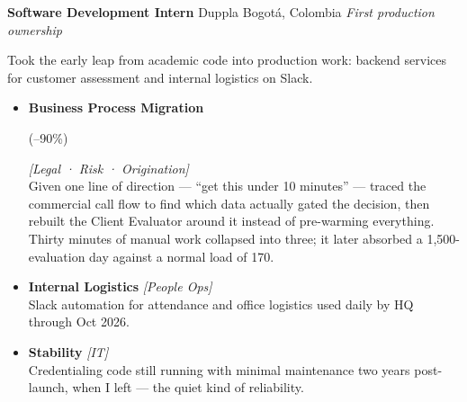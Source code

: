 \documentclass[11pt,a4paper,sans]{moderncv}
\newcommand{\impact}[1]{{\color{slate}\small #1}}
\newcommand{\impactnext}[1]{\\[0.4em]\impact{#1}}
\newcommand{\metric}[1]{%
  \begingroup
  \setlength{\fboxsep}{2pt}%
  \colorbox{whisper}{\color{navy}\bfseries\strut #1}%
  \endgroup
}
\newcommand{\stakeholders}[1]{{\color{azure}\footnotesize\textsf{\textit{[#1]}}}}
\newcommand{\rolebold}[1]{{\color{navy}\bfseries #1}}
\begin{document}
%
  {\textbf{Software Development Intern}}%
  {Duppla}%
  {Bogotá, Colombia}%
  {\textit{First production ownership}}{%
  Took the early leap from academic code into production work: backend services for customer assessment and internal logistics on Slack.
  \begin{itemize}
    \item \rolebold{Business Process Migration} \metric{(--90\%)} \stakeholders{Legal · Risk · Origination}\\
      \impact{Given one line of direction --- ``get this under 10 minutes'' --- traced the commercial call flow to find which data actually gated the decision, then rebuilt the Client Evaluator around it instead of pre-warming everything.}
      \impactnext{Thirty minutes of manual work collapsed into three; it later absorbed a 1,500-evaluation day against a normal load of 170.}
    \item \rolebold{Internal Logistics} \stakeholders{People Ops}\\
      \impact{Slack automation for attendance and office logistics used daily by HQ through Oct 2026.}
    \item \rolebold{Stability} \stakeholders{IT}\\
      \impact{Credentialing code still running with minimal maintenance two years post-launch, when I left --- the quiet kind of reliability.}
  \end{itemize}
}
\end{document}
